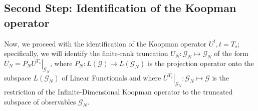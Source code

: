 \documentclass{article}
\begin{document}
    \subsection{Second Step: Identification of the Koopman operator}

        Now, we proceed with the identification of the Koopman operator $U^t , t = T_s$; specifically, we will identify the finite-rank truncation $U_N: \mathcal{G}_N \mapsto \mathcal{G}_N$ of the form $U_N = P_N \left.U^{T_s}\right|_{\mathcal{G}_N}$, where $P_N : L\left(\mathcal{G}\right) \mapsto L\left(\mathcal{G}_N\right)$ is the projection operator onto the subspace $L\left(\mathcal{G}_N\right)$ of Linear Functionals and where $\left.U^{T_s}\right|_{\mathcal{G}_N} : \mathcal{G}_N \mapsto \mathcal{G}$ is the restriction of the Infinite-Dimensional Koopman operator to the truncated subspace of observables $\mathcal{G}_N$.

    
\end{document}
